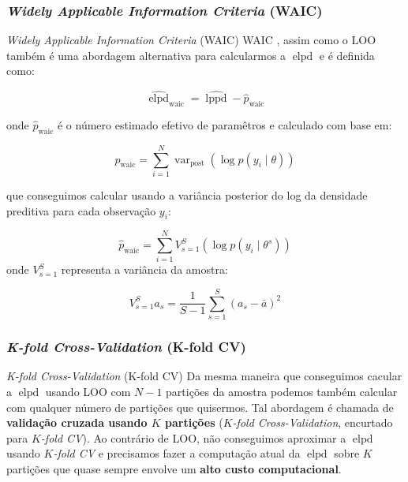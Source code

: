 \subsubsection{\textit{Widely Applicable Information Criteria} (WAIC)}
\begin{frame}{\textit{Widely Applicable Information Criteria} (WAIC)}
    \footnotesize
    WAIC \parencite{watanabe2010asymptotic}, assim como o LOO também é uma
    abordagem alternativa para calcularmos a $\operatorname{elpd}$ e é definida como:

    $$
    \widehat{\operatorname{elpd}}_{\text{waic}} = \widehat{\operatorname{lppd}} - \widehat{p}_{\text{waic}}
    $$

    onde $\widehat{p}_{\text{waic}}$ é o número estimado efetivo de paramêtros e
    calculado com base em:

    $$
    \widehat{p}_{\text{waic}} = \sum_{i=1}^N \operatorname{var}_{\text{post}} (\log p(y_i \mid \theta))
    $$

    que conseguimos calcular usando a variância posterior do log da densidade preditiva para cada observação $y_i$:

    $$
    \widehat{p}_{\text{waic}} = \sum_{i=1}^N V^S_{s=1} (\log p(y_i \mid \theta^s))
    $$
    onde $V^S_{s=1}$ representa a variância da amostra:

    $$
    V^S_{s=1} a_s = \frac{1}{S-1} \sum^S_{s=1} (a_s - \bar{a})^2
    $$
\end{frame}

\subsubsection{\textit{K-fold Cross-Validation} (K-fold CV)}
\begin{frame}{\textit{K-fold Cross-Validation} (K-fold CV)}
    Da mesma maneira que conseguimos cacular a $\operatorname{elpd}$ usando LOO
    com $N-1$ partições da amostra podemos também calcular com qualquer número de
    partições que quisermos.
    \vfill
    Tal abordagem é chamada de \textbf{validação cruzada usando $K$ partições}
    (\textit{$K$-fold Cross-Validation}, encurtado para \textit{$K$-fold CV}).
    \vfill
    Ao contrário de LOO, não conseguimos aproximar a
    $\operatorname{elpd}$ usando \textit{$K$-fold CV} e precisamos fazer a computação
    atual da $\operatorname{elpd}$ sobre $K$ partições que quase sempre envolve
    um \textbf{alto custo computacional}.
\end{frame}

